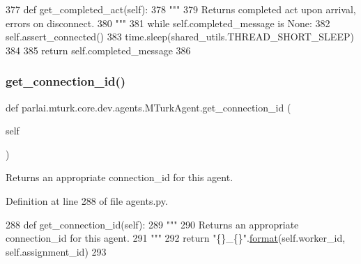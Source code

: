 \begin{DoxyCode}
377     \textcolor{keyword}{def }get\_completed\_act(self):
378         \textcolor{stringliteral}{"""}
379 \textcolor{stringliteral}{        Returns completed act upon arrival, errors on disconnect.}
380 \textcolor{stringliteral}{        """}
381         \textcolor{keywordflow}{while} self.completed\_message \textcolor{keywordflow}{is} \textcolor{keywordtype}{None}:
382             self.assert\_connected()
383             time.sleep(shared\_utils.THREAD\_SHORT\_SLEEP)
384 
385         \textcolor{keywordflow}{return} self.completed\_message
386 
\end{DoxyCode}
\mbox{\label{classparlai_1_1mturk_1_1core_1_1dev_1_1agents_1_1MTurkAgent_abba4a01586ccd7b85e31175cf5c9f487}} 
\subsubsection{\texorpdfstring{get\+\_\+connection\+\_\+id()}{get\_connection\_id()}}
{\footnotesize\ttfamily def parlai.\+mturk.\+core.\+dev.\+agents.\+M\+Turk\+Agent.\+get\+\_\+connection\+\_\+id (\begin{DoxyParamCaption}\item[{}]{self }\end{DoxyParamCaption})}

\begin{DoxyVerb}Returns an appropriate connection_id for this agent.
\end{DoxyVerb}
 

Definition at line 288 of file agents.\+py.


\begin{DoxyCode}
288     \textcolor{keyword}{def }get\_connection\_id(self):
289         \textcolor{stringliteral}{"""}
290 \textcolor{stringliteral}{        Returns an appropriate connection\_id for this agent.}
291 \textcolor{stringliteral}{        """}
292         \textcolor{keywordflow}{return} \textcolor{stringliteral}{"\{\}\_\{\}"}.\hyperlink{namespaceparlai_1_1chat__service_1_1services_1_1messenger_1_1shared__utils_a32e2e2022b824fbaf80c747160b52a76}{format}(self.worker\_id, self.assignment\_id)
293 
\end{DoxyCode}
\mbox{\label{classparlai_1_1mturk_1_1core_1_1dev_1_1agents_1_1MTurkAgent_a51dcf248b6b614e391f83ff6a195787c}} 

